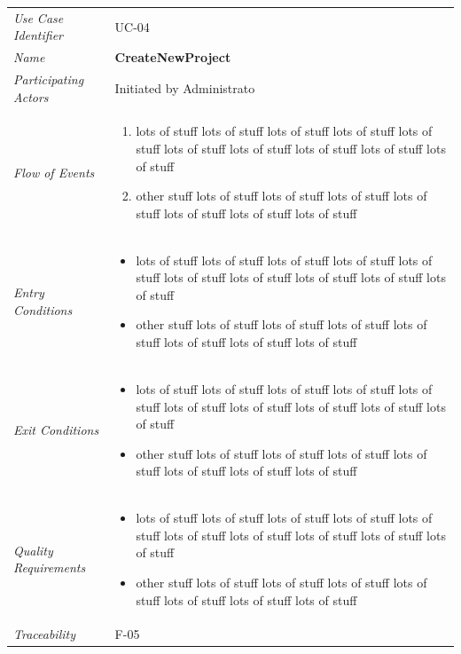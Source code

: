 \documentclass[12pt,letterpaper]{article}
\begin{document}
\begin{center}
	\begin{tabu} to 
		\toprule
		Use Case Identifier & UC-04 \\
		Name & {\bf CreateNewProject} \\
		Participating Actors & Initiated by Administrato \\
		Flow of Events & 
	    \begin{enumerate}[topsep=-1em]
		    \item lots of stuff lots of stuff lots of stuff lots of stuff lots of stuff lots of stuff lots of stuff lots of stuff lots of stuff lots of stuff
		    \item other stuff lots of stuff lots of stuff lots of stuff lots of stuff lots of stuff lots of stuff lots of stuff
		\end{enumerate} \\

		Entry Conditions &
		\begin{itemize}[topsep=-1em]
		    \item lots of stuff lots of stuff lots of stuff lots of stuff lots of stuff lots of stuff lots of stuff lots of stuff lots of stuff lots of stuff
		    \item other stuff lots of stuff lots of stuff lots of stuff lots of stuff lots of stuff lots of stuff lots of stuff
        \end{itemize} \\

		Exit Conditions &
		\begin{itemize}[topsep=-1em]
		    \item lots of stuff lots of stuff lots of stuff lots of stuff lots of stuff lots of stuff lots of stuff lots of stuff lots of stuff lots of stuff
		    \item other stuff lots of stuff lots of stuff lots of stuff lots of stuff lots of stuff lots of stuff lots of stuff
        \end{itemize} \\

		Quality Requirements &
		\begin{itemize}[topsep=-1em]
		    \item lots of stuff lots of stuff lots of stuff lots of stuff lots of stuff lots of stuff lots of stuff lots of stuff lots of stuff lots of stuff
		    \item other stuff lots of stuff lots of stuff lots of stuff lots of stuff lots of stuff lots of stuff lots of stuff
        \end{itemize} \\

		Traceability & F-05 \\
		\toprule
	\end{tabu}
\end{center}
\end{document}
